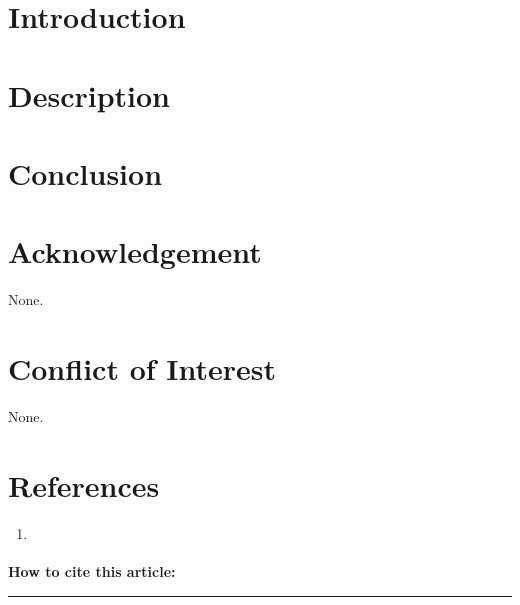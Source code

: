 \documentclass[10pt]{article} %
\begin{document}
\begin{multicols}{2}
\fontsize{9}{10.8}\selectfont\color{Black}

\section*{Introduction}
\section*{Description}

\section*{Conclusion}

\section*{Acknowledgement}
None.

\section*{Conflict of Interest}
None.

\section*{References}
\fontsize{8}{9.6}\selectfont
\begin{enumerate}
        \item \href{\VAR{item.parentLink}}{ }
\end{enumerate}

\begin{framed}
\noindent\fontsize{8.5}{10.2}\selectfont
\textbf{How to cite this article:} 
\end{framed}


\end{multicols}

\vfill
\noindent
\hspace*{0pt}\color{Dark_Violet}\rule{\textwidth}{1pt}
\par\vspace{0.3cm} %
\end{document}
